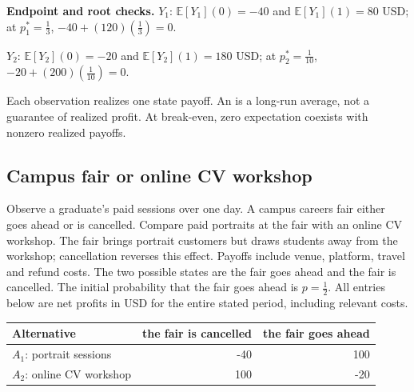\textbf{Endpoint and root checks.} $Y_1$: $\mathbb E[Y_1](0)=-40$ and $\mathbb E[Y_1](1)=80$ USD; at $p_1^*=\frac{1}{3}$, $-40+(120)(\frac{1}{3})=0$.

$Y_2$: $\mathbb E[Y_2](0)=-20$ and $\mathbb E[Y_2](1)=180$ USD; at $p_2^*=\frac{1}{10}$, $-20+(200)(\frac{1}{10})=0$.

Each observation realizes one state payoff. An  is a long-run average,
not a guarantee of realized profit. At break-even, zero expectation coexists with nonzero realized payoffs.
\clearpage
\subsection{Campus fair or online CV workshop}\label{prob:c3-coffee}
Observe a graduate's paid sessions over one day. A campus careers fair either goes ahead or is cancelled. Compare paid portraits at the fair with an online CV workshop. The fair brings portrait customers but draws students away from the workshop; cancellation reverses this effect. Payoffs include venue, platform, travel and refund costs. The two possible states are the fair goes ahead and the fair is cancelled. The initial probability that the fair goes ahead is $p=\frac{1}{2}$. All entries below are net profits in USD for the entire stated period, including relevant costs.
\begin{center}\begin{tabular}{lrr}\toprule Alternative & the fair is cancelled & the fair goes ahead\\\midrule
$A_1$: portrait sessions & -40 & 100\\
$A_2$: online CV workshop & 100 & -20\\
\bottomrule\end{tabular}\end{center}
